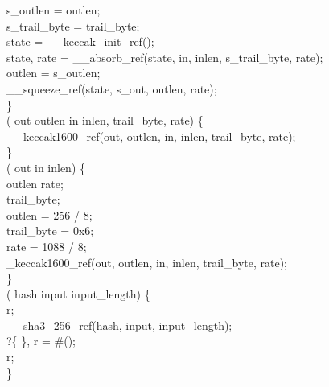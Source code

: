 s_outlen = outlen;\\
s_trail_byte = trail_byte;\\
state = __keccak_init_ref();\\
state, rate = __absorb_ref(state, in, inlen, s_trail_byte, rate);\\
outlen = s_outlen;\\
__squeeze_ref(state, s_out, outlen, rate);\\
\}\\
 (  out outlen in inlen,   trail_byte,   rate) \{\\
__keccak1600_ref(out, outlen, in, inlen, trail_byte, rate);\\
\}\\
  (  out in inlen) \{\\
  outlen rate;\\
  trail_byte;\\
outlen = 256 / 8;\\
trail_byte = 0x6;\\
rate = 1088 / 8;\\
_keccak1600_ref(out, outlen, in, inlen, trail_byte, rate);\\
\}\\
  (  hash input input_length) \jasminarrow{}   \{\\
  r;\\
__sha3_256_ref(hash, input, input_length);\\
?\{
\}, r = \#();\\
 r;\\
\}
